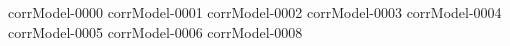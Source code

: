 {corrModel-0000}
{corrModel-0001}
{corrModel-0002}
{corrModel-0003}
{corrModel-0004}
{corrModel-0005}
{corrModel-0006}
{corrModel-0008}
